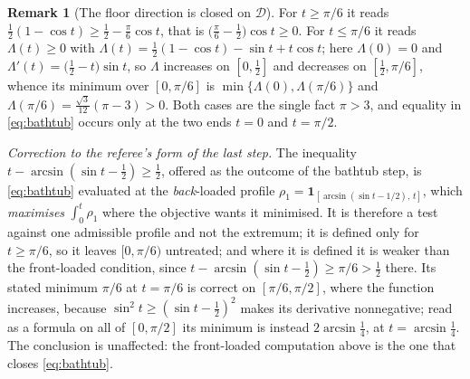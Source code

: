 \documentclass[11pt]{article}
\theoremstyle{definition}
\newtheorem{remark}[theorem]{Remark}
\begin{document}
\begin{remark}[The floor direction is closed on $\mathcal D$]
For $t\ge\pi/6$ it reads $\tfrac12(1-\cos t)\ge\tfrac12-\tfrac\pi6\cos t$, that is
$\bigl(\tfrac\pi6-\tfrac12\bigr)\cos t\ge0$. For $t\le\pi/6$ it reads $\Lambda(t)\ge0$ with
$\Lambda(t)=\tfrac12(1-\cos t)-\sin t+t\cos t$; here $\Lambda(0)=0$ and
$\Lambda'(t)=\bigl(\tfrac12-t\bigr)\sin t$, so $\Lambda$ increases on $[0,\tfrac12]$ and
decreases on $[\tfrac12,\pi/6]$, whence its minimum over $[0,\pi/6]$ is
$\min\{\Lambda(0),\Lambda(\pi/6)\}$ and
$\Lambda(\pi/6)=\tfrac{\sqrt3}{12}(\pi-3)>0$. Both cases are the single fact $\pi>3$, and
equality in \eqref{eq:bathtub} occurs only at the two ends $t=0$ and $t=\pi/2$.

\emph{Correction to the referee's form of the last step.} The inequality
$t-\arcsin(\sin t-\tfrac12)\ge\tfrac12$, offered as the outcome of the bathtub step, is
\eqref{eq:bathtub} evaluated at the \emph{back}-loaded profile
$\rho_1=\mathbf 1_{[\arcsin(\sin t-1/2),\,t]}$, which \emph{maximises} $\int_0^t\rho_1$ where
the objective wants it minimised. It is therefore a test against one admissible profile and
not the extremum; it is defined only for $t\ge\pi/6$, so it leaves $[0,\pi/6)$ untreated; and
where it is defined it is weaker than the front-loaded condition, since
$t-\arcsin(\sin t-\tfrac12)\ge\pi/6>\tfrac12$ there. Its stated minimum $\pi/6$ at $t=\pi/6$
is correct on $[\pi/6,\pi/2]$, where the function increases, because
$\sin^2t\ge(\sin t-\tfrac12)^2$ makes its derivative nonnegative; read as a formula on all
of $[0,\pi/2]$ its minimum is instead $2\arcsin\tfrac14$, at
$t=\arcsin\tfrac14$.
The conclusion is unaffected: the front-loaded computation above is the one that closes
\eqref{eq:bathtub}.


\end{remark}
\end{document}
